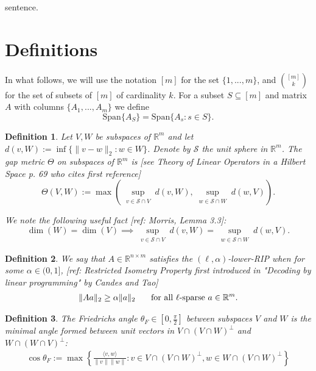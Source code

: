 \documentclass[journal,onecolumn]{IEEEtran}
\newtheorem{definition}{Definition}
\begin{document}
 sentence. 

\section{Definitions}

In what follows, we will use the notation $[m]$ for the set $\{1, ..., m\}$, and ${[m] \choose k}$ for the set of subsets of $[m]$ of cardinality $k$. For a subset $S \subseteq [m]$ and matrix $A$ with columns $\{A_1,...,A_m\}$ we define
\begin{equation*}
\text{Span}\{A_S\} = \text{Span}\{A_s: s \in S\}.
\end{equation*}

\begin{definition}
Let $V, W$ be subspaces of $\mathbb{R}^m$ and let $d(v,W) := \inf\{\|v-w\|_2: w \in W\}$. Denote by $\mathcal{S}$ the unit sphere in $\mathbb{R}^m$. The \emph{gap} metric $\Theta$ on subspaces of $\mathbb{R}^{m}$ is [see Theory of Linear Operators in a Hilbert Space p. 69 who cites first reference]
\begin{equation}\label{SubspaceMetric}
\Theta(V,W) := \max\left( \sup_{\substack{v \in \mathcal{S} \cap V}} d(v,W), \sup_{\substack{w \in \mathcal{S} \cap W}} d(w,V) \right).
\end{equation}

We note the following useful fact [ref: Morris, Lemma 3.3]:
\begin{equation}\label{SubspaceMetricSameDim}
\dim(W) = \dim(V) \implies \sup_{\substack{v \in \mathcal{S} \cap V}} d(v,W)  = \sup_{\substack{w \in \mathcal{S} \cap W}} d(w,V).
\end{equation}
\end{definition}

\begin{definition}\label{RestrictedIsometryProperty}
We say that $A \in  \mathbb R^{n \times m}$ satisfies the \emph{$(\ell,\alpha)$-lower-RIP}  when for some $\alpha \in (0,1]$, [ref: Restricted Isometry Property first introduced in "Decoding by linear programming" by Candes and Tao]
\begin{align*}
\|Aa\|_2 \geq  \alpha \|a\|_2 \indent \text{ for all $\ell$-sparse } a \in \mathbb{R}^m.
\end{align*}
\end{definition}

\begin{definition}
The \emph{Friedrichs angle} $\theta_F \in [0,\frac{\pi}{2}]$ between subspaces $V$ and $W$ is the minimal angle formed between unit vectors in $V \cap (V \cap W)^\perp$ and $W \cap (W \cap V)^\perp$:
\begin{align}
\cos\theta_F := \max\left\{ \frac{ \langle v, w \rangle }{\|v\|\|w\|}: v \in V \cap (V \cap W)^\perp, w \in W \cap (V \cap W)^\perp \right\}
\end{align}
\end{definition}
\end{document}
